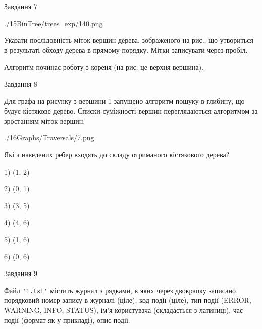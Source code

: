 \documentclass[12pt, ukrainian]{article}
\def\code#1{\Verb!#1!}
\begin{document}
{\vspace{10mm}\par

\newpage
\begin{minipage}[t]{9.7cm}
               
{\begin{center}Завдання {7}\end{center}}
\vspace{-6mm}

\begin{center}
	{./15BinTree/trees_exp/140.png}
\end{center}
Указати послідовність міток вершин дерева, зображеного на рис., що утвориться в результаті обходу дерева в прямому порядку. Мітки записувати через пробіл.\par Алгоритм починає роботу з кореня (на рис. це верхня вершина).\par

\end{minipage}
\vline \hspace{8mm}
\begin{minipage}[t]{8.0cm}
               
{\begin{center}Завдання {8}\end{center}}
\vspace{-6mm}
Для графа на рисунку з вершини 1 запущено алгоритм пошуку в глибину, що будує кістякове дерево. Списки суміжності вершин переглядаються алгоритмом за зростанням міток вершин.\par
\begin{center}
	{./16Graphs/Traversals/7.png}
\end{center}
\par Які з наведених ребер входять до складу отриманого кістякового дерева?\par
1) (1, 2)\par
2) (0, 1)\par
3) (3, 5)\par
4) (4, 6)\par
5) (1, 6)\par
6) (0, 6)\par
{\vskip 15pt} \par

\end{minipage}

               
{\begin{center}Завдання {9}\end{center}}
\vspace{-6mm}
Файл \code{'1.txt'} містить журнал з рядками, в яких через двокрапку записано поряд\-ко\-вий номер запису в журналі (ціле), код події (ціле), тип події (ERROR,\\ WARNING, INFO, STATUS), ім'я користувача (складається з латиниці), час події (фор\-мат як у прикладі), опис події.

}
\end{document}
